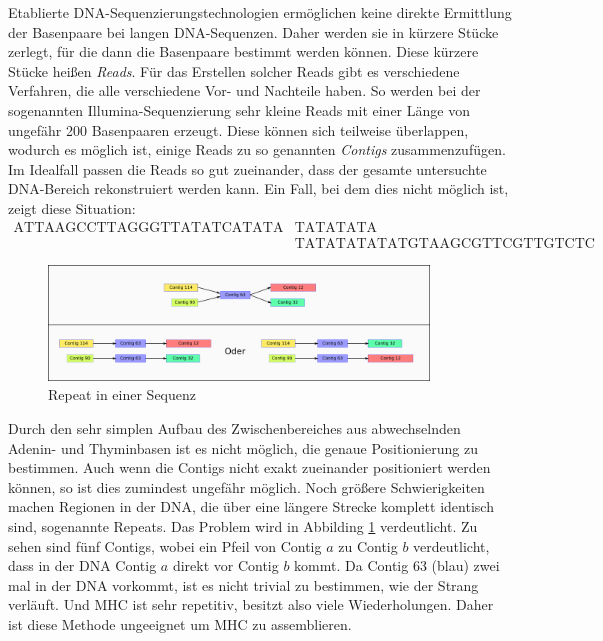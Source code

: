 Etablierte DNA-Sequenzierungstechnologien ermöglichen keine direkte Ermittlung der Basenpaare bei langen DNA-Sequenzen. Daher werden sie in kürzere Stücke zerlegt, für die dann die Basenpaare bestimmt werden können. Diese kürzere Stücke heißen \emph{Reads}. Für das Erstellen solcher Reads gibt es verschiedene Verfahren, die alle verschiedene Vor- und Nachteile haben. So werden bei der sogenannten Illumina-Sequenzierung sehr kleine Reads mit einer Länge von ungefähr 200 Basenpaaren erzeugt. Diese können sich teilweise überlappen, wodurch es möglich ist, einige Reads zu so genannten \emph{Contigs} zusammenzufügen. Im Idealfall passen die Reads so gut zueinander, dass der gesamte untersuchte DNA-Bereich rekonstruiert werden kann. Ein Fall, bei dem dies nicht möglich ist, zeigt diese Situation:
\begin{align*}
\text{ATTAAGCCTTAGGGTTATATCATATA}&\text{TATATATA}\\
&\text{TATATATATATGTAAGCGTTCGTTGTCTC}
\end{align*}
\begin{figure}[b]
\begin{center}
\includegraphics[width=0.9\textwidth]{bilder/repeat}
\end{center}
\caption{Repeat in einer Sequenz}
\label{repeat}
\end{figure}
Durch den sehr simplen Aufbau des Zwischenbereiches aus abwechselnden Adenin- und Thyminbasen ist es nicht möglich, die genaue Positionierung zu bestimmen. Auch wenn die Contigs nicht exakt zueinander positioniert werden können, so ist dies zumindest ungefähr möglich. Noch größere Schwierigkeiten machen Regionen in der DNA, die über eine längere Strecke komplett identisch sind, sogenannte Repeats. Das Problem wird in Abbilding \ref{repeat} verdeutlicht. Zu sehen sind fünf Contigs, wobei ein Pfeil von Contig $a$ zu Contig $b$ verdeutlicht, dass in der DNA Contig $a$ direkt vor Contig $b$ kommt. Da Contig 63 (blau) zwei mal in der DNA vorkommt, ist es nicht trivial zu bestimmen, wie der Strang verläuft. Und MHC ist sehr repetitiv, besitzt also viele Wiederholungen. Daher ist diese Methode ungeeignet um MHC zu assemblieren.


